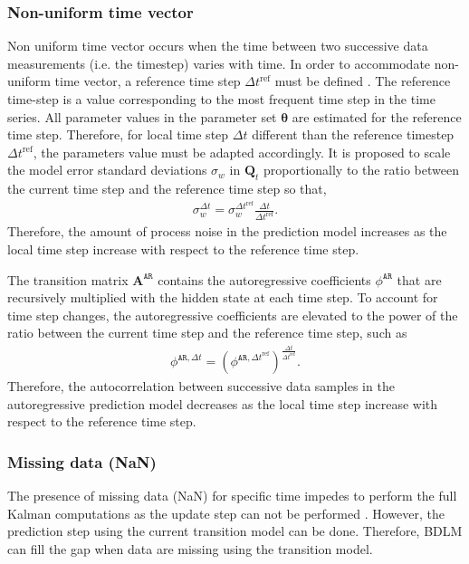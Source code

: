 \subsubsection{Non-uniform time vector}

Non uniform time vector occurs when the time between two successive data measurements (i.e. the timestep) varies with time.
In order to accommodate non-uniform time vector, a reference time step $\Delta t^{\text{ref}} $ must be defined \cite{STC:STC2035}. 
The reference time-step is a value corresponding to the most frequent time step in the time series.
All parameter values in the parameter set $\bm \theta$ are estimated for the reference time step. 
Therefore, for local time step $\Delta t$ different than the reference timestep $\Delta t^{\text{ref}} $, the parameters value must be adapted accordingly.
It is proposed to scale the model error standard deviations $\sigma_{w}$ in $\mathbf{Q}_{t}$  proportionally to the ratio between the current time step and the reference time step so that,
\begin{gather*}
\sigma_{w}^{\Delta t}= \sigma_{w}^{\Delta t ^{\text{ref}}}\frac{\Delta t}{\Delta t ^{\text{ref}}}.
\end{gather*}
Therefore, the amount of process noise in the prediction model increases as the local time step increase with respect to the reference time step.

The transition matrix $\mathbf{A}^{\mathtt{AR}}$ contains the autoregressive coefficients $\phi^{\mathtt{AR}}$ that are recursively multiplied with the hidden state at each time step. 
To account for time step changes, the autoregressive coefficients are elevated to the power of the ratio between the current time step and the reference time step, such as
\begin{gather*}
\phi^{\mathtt{AR}, \Delta t}=  (\phi^{\mathtt{AR}, \Delta t ^{\text{ref}}})^{\frac{\Delta t}{\Delta t ^{\text{ref}}}}.
\end{gather*}
Therefore, the autocorrelation between successive data samples in the autoregressive prediction model decreases as the local time step increase with respect to the reference time step.

\subsubsection{Missing data (NaN)}

The presence of missing data (NaN) for specific time impedes to perform the full Kalman computations as the update step can not be performed \cite{STC:STC2035}.
However, the prediction step using the current transition model can be done.
Therefore, BDLM can fill the gap when data are missing using the transition model.


